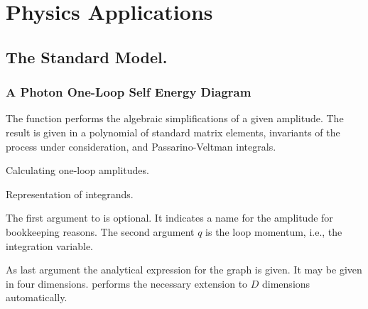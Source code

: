 \chapter{Physics Applications}

\section{The Standard Model.}

\subsection{A Photon One-Loop Self Energy Diagram}
\label{self}
The function  performs the algebraic simplifications 
of a given amplitude. The result is given in a polynomial of standard 
matrix elements, invariants of the process under consideration, 
and Passarino-Veltman integrals.

 {Calculating one-loop amplitudes.}

 {Representation of integrands.}

The first argument to  is optional. It indicates  a name
for the amplitude for bookkeeping reasons. 
The second argument $q$ is the loop momentum, i.e., the integration 
variable. 

As last argument the analytical expression for the graph is given.      
It may be given in four dimensions.  performs the 
necessary extension to $D$ dimensions automatically. 

